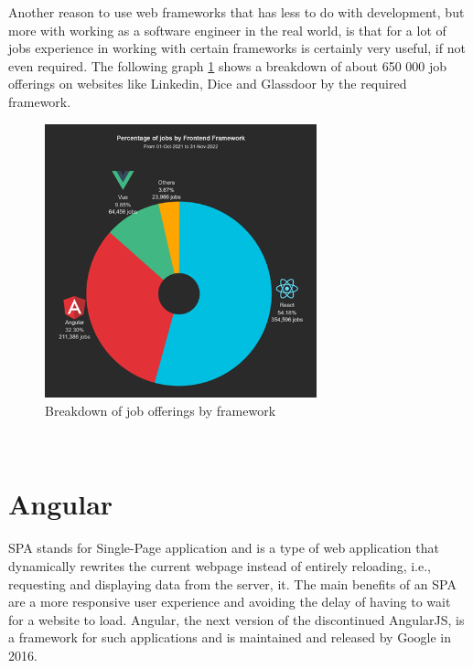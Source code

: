 Another reason to use web frameworks that has less to do with development, but more with working as a software engineer in 
the real world, is that for a lot of jobs experience in working with certain frameworks is certainly very useful, if not 
even required. The following graph \ref{fig:WebframeworkJobs} shows a breakdown of about 650 000 job offerings on websites like Linkedin, 
Dice and Glassdoor by the required framework. \cite{WebframeworkJobs}
\\
\begin{figure}[htb]
  \centering
  \includegraphics[width=0.7\textwidth]{pics/piechartwebframework.png}
  \caption{Breakdown of job offerings by framework}
  \label{fig:WebframeworkJobs}
\end{figure}
\\
\section{Angular}
SPA stands for Single-Page application and is a type of web application that dynamically rewrites the 
current webpage instead of entirely reloading, i.e., requesting and displaying data from the server, it. 
The main benefits of an SPA are a more responsive user experience and avoiding the delay of having to wait 
for a website to load. Angular, the next version of the discontinued AngularJS, is a framework for such 
applications and is maintained and released by Google in 2016. \cite{RoadToReact}


